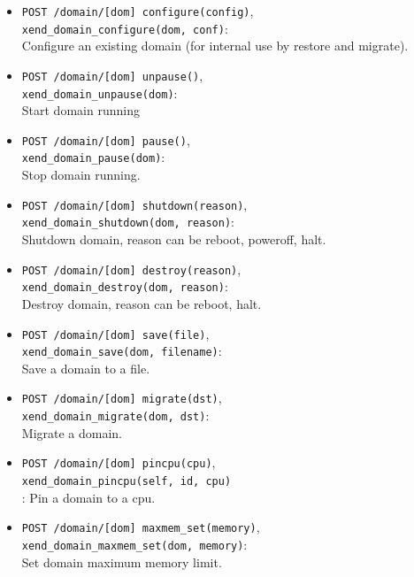 \documentclass[11pt,twoside,final,openright]{report}
\begin{document}
\begin{itemize}
\item {\tt POST /domain/[dom] configure(config)},\\
  {\tt xend\_domain\_configure(dom, conf)}:\\
  Configure an existing domain (for internal use by restore and migrate).

\item {\tt POST /domain/[dom] unpause()},\\
  {\tt xend\_domain\_unpause(dom)}:\\
  Start domain running

\item {\tt POST /domain/[dom] pause()},\\
  {\tt xend\_domain\_pause(dom)}:\\
  Stop domain running.

\item {\tt POST /domain/[dom] shutdown(reason)},\\
  {\tt xend\_domain\_shutdown(dom, reason)}:\\
  Shutdown domain, reason can be reboot, poweroff, halt.

\item {\tt POST /domain/[dom] destroy(reason)},\\
  {\tt xend\_domain\_destroy(dom, reason)}:\\
  Destroy domain, reason can be reboot, halt.

\item {\tt POST /domain/[dom] save(file)},\\
  {\tt xend\_domain\_save(dom, filename)}:\\
  Save a domain to a file.

\item {\tt POST /domain/[dom] migrate(dst)},\\
  {\tt xend\_domain\_migrate(dom, dst)}:\\
  Migrate a domain.

\item {\tt POST /domain/[dom] pincpu(cpu)},\\
  {\tt xend\_domain\_pincpu(self, id, cpu)}\\:
  Pin a domain to a cpu.

\item {\tt POST /domain/[dom] maxmem\_set(memory)},\\
  {\tt xend\_domain\_maxmem\_set(dom, memory)}:\\
  Set domain maximum memory limit.


\end{itemize}
\end{document}
